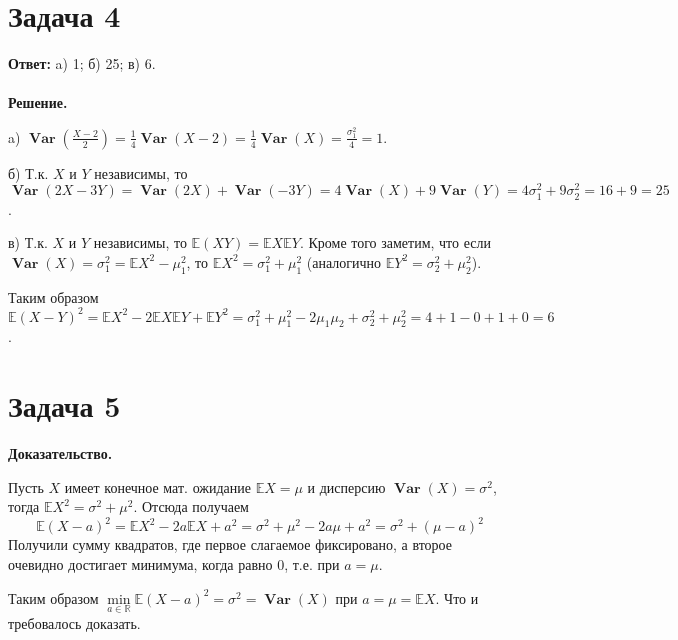 \documentclass{article}
\DeclareMathOperator{\Var}{\textbf{Var}}
\begin{document}
\section*{Задача 4}
{\bf Ответ: } a) 1; б) 25; в) 6.
\\
\\
{\bf Решение.}
\par
a) $\Var\left(\frac{X-2}{2}\right)=\frac{1}{4}\Var(X-2)=\frac{1}{4}\Var(X)=\frac{\sigma_1^2}{4}=1$.
\par
б) Т.к. $X$ и $Y$ независимы, то $\Var(2X-3Y)=\Var(2X)+\Var(-3Y)=4\Var(X)+9\Var(Y)=4\sigma_1^2+9\sigma_2^2=16+9=25$.
\par
в) Т.к. $X$ и $Y$ независимы, то $\mathbb{E}(XY)=\mathbb{E}X\mathbb{E}Y$. Кроме того заметим, что если $\Var(X)=\sigma_1^2=\mathbb{E}X^2-\mu_1^2$, то $\mathbb{E}X^2=\sigma_1^2+\mu_1^2$ (аналогично $\mathbb{E}Y^2=\sigma_2^2+\mu_2^2$). 
\par
Таким образом $\mathbb{E}(X-Y)^2=\mathbb{E}X^2-2\mathbb{E}X\mathbb{E}Y+\mathbb{E}Y^2=\sigma_1^2+\mu_1^2-2\mu_1\mu_2+\sigma_2^2+\mu_2^2=4+1-0+1+0=6$.
\section*{Задача 5}
{\bf Доказательство.}
\par
Пусть $X$ имеет конечное мат. ожидание  $\mathbb{E}X = \mu$ и дисперсию $\Var(X)=\sigma^2$, тогда $\mathbb{E}X^2=\sigma^2+\mu^2$. Отсюда получаем 
$$\mathbb{E}(X-a)^2=\mathbb{E}X^2-2a\mathbb{E}X+a^2=\sigma^2+\mu^2-2a\mu+a^2=\sigma^2+(\mu-a)^2$$
Получили сумму квадратов, где первое слагаемое фиксировано, а второе очевидно достигает минимума, когда равно 0, т.е. при $a=\mu$.
\par
Таким образом $\min\limits_{a\in\mathbb{R}}\mathbb{E}(X-a)^2=\sigma^2=\Var(X)$ при $a=\mu=\mathbb{E}X$. Что и требовалось доказать.
\end{document}

